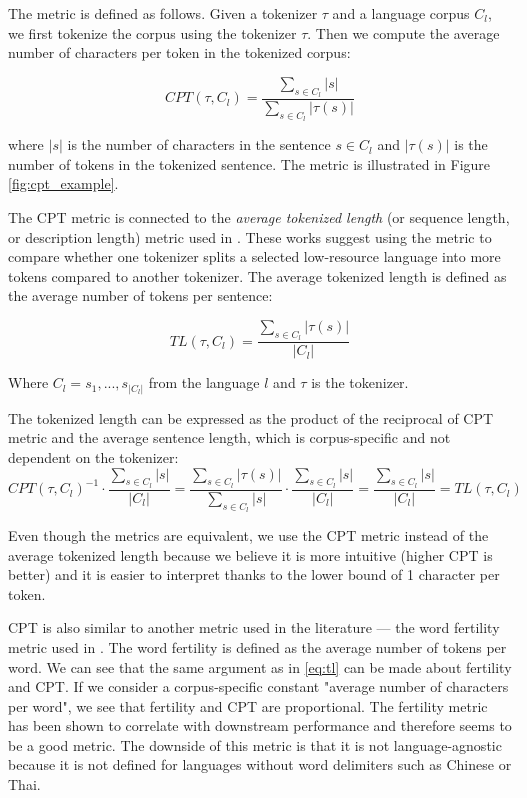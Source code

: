 The metric is defined as follows. Given a tokenizer $\tau$ and a language corpus $C_l$, we first tokenize the corpus using the tokenizer $\tau$. Then we compute the average number of characters per token in the tokenized corpus:

\begin{equation}
    CPT(\tau, C_l) = \frac{\sum_{s \in C_l}|s|}{\sum_{s \in C_l}|\tau(s)|}
\end{equation}

where $|s|$ is the number of characters in the sentence $s \in C_l$ and $|\tau(s)|$ is the number of tokens in the tokenized sentence. The metric is illustrated in Figure \ref{fig:cpt_example}.

The CPT metric is connected to the \textit{average tokenized length} (or sequence length, or description length) metric used in \citet{chung_improving_2020,liang_xlm-v_2023}. 
These works suggest using the metric to compare whether one tokenizer splits a selected low-resource language into more tokens compared to another tokenizer. The average tokenized length is defined as the average number of tokens per sentence: 

\begin{equation}
\label{eq:tl_def}
    TL(\tau, C_l) = \frac{\sum_{s \in C_l}|\tau(s)|}{|C_l|}
\end{equation}

Where $C_l = {s_1, ..., s_{|C_l|}}$ from the language $l$ and $\tau$ is the tokenizer.

The tokenized length can be expressed as the product of the reciprocal of CPT metric and the average sentence length, which is corpus-specific and not dependent on the tokenizer:
\begin{equation}
\label{eq:tl}
    CPT(\tau, C_l)^{-1} \cdot \frac{\sum_{s \in C_l}|s|}{|C_l|} = \frac{\sum_{s \in C_l}|\tau(s)|}{\sum_{s \in C_l}|s|} \cdot \frac{\sum_{s \in C_l}|s|}{|C_l|} = \frac{\sum_{s \in C_l}|s|}{|C_l|} = TL(\tau, C_l)
\end{equation}

Even though the metrics are equivalent, we use the CPT metric instead of the average tokenized length because we believe it is more intuitive (higher CPT is better) and it is easier to interpret thanks to the lower bound of 1 character per token.

CPT is also similar to another metric used in the literature --- the word fertility metric used in \citet{rust_how_2021}. The word fertility is defined as the average number of tokens per word. We can see that the same argument as in \autoref{eq:tl} can be made about fertility and CPT. If we consider a corpus-specific constant "average number of characters per word", we see that fertility and CPT are proportional. The fertility metric has been shown to correlate with downstream performance and therefore seems to be a good metric. The downside of this metric is that it is not language-agnostic because it is not defined for languages without word delimiters such as Chinese or Thai.

